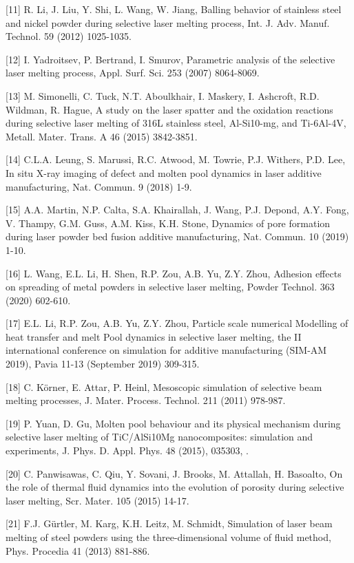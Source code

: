 \documentclass[10pt]{article}
\begin{document}
[11] R. Li, J. Liu, Y. Shi, L. Wang, W. Jiang, Balling behavior of stainless steel and nickel powder during selective laser melting process, Int. J. Adv. Manuf. Technol. 59 (2012) 1025-1035.

[12] I. Yadroitsev, P. Bertrand, I. Smurov, Parametric analysis of the selective laser melting process, Appl. Surf. Sci. 253 (2007) 8064-8069.

[13] M. Simonelli, C. Tuck, N.T. Aboulkhair, I. Maskery, I. Ashcroft, R.D. Wildman, R. Hague, A study on the laser spatter and the oxidation reactions during selective laser melting of 316L stainless steel, Al-Si10-mg, and Ti-6Al-4V, Metall. Mater. Trans. A 46 (2015) 3842-3851.

[14] C.L.A. Leung, S. Marussi, R.C. Atwood, M. Towrie, P.J. Withers, P.D. Lee, In situ X-ray imaging of defect and molten pool dynamics in laser additive manufacturing, Nat. Commun. 9 (2018) 1-9.

[15] A.A. Martin, N.P. Calta, S.A. Khairallah, J. Wang, P.J. Depond, A.Y. Fong, V. Thampy, G.M. Guss, A.M. Kiss, K.H. Stone, Dynamics of pore formation during laser powder bed fusion additive manufacturing, Nat. Commun. 10 (2019) 1-10.

[16] L. Wang, E.L. Li, H. Shen, R.P. Zou, A.B. Yu, Z.Y. Zhou, Adhesion effects on spreading of metal powders in selective laser melting, Powder Technol. 363 (2020) 602-610.

[17] E.L. Li, R.P. Zou, A.B. Yu, Z.Y. Zhou, Particle scale numerical Modelling of heat transfer and melt Pool dynamics in selective laser melting, the II international conference on simulation for additive manufacturing (SIM-AM 2019), Pavia 11-13 (September 2019) 309-315.

[18] C. Körner, E. Attar, P. Heinl, Mesoscopic simulation of selective beam melting processes, J. Mater. Process. Technol. 211 (2011) 978-987.

[19] P. Yuan, D. Gu, Molten pool behaviour and its physical mechanism during selective laser melting of TiC/AlSi10Mg nanocomposites: simulation and experiments, J. Phys. D. Appl. Phys. 48 (2015), 035303, .

[20] C. Panwisawas, C. Qiu, Y. Sovani, J. Brooks, M. Attallah, H. Basoalto, On the role of thermal fluid dynamics into the evolution of porosity during selective laser melting, Scr. Mater. 105 (2015) 14-17.

[21] F.J. Gürtler, M. Karg, K.H. Leitz, M. Schmidt, Simulation of laser beam melting of steel powders using the three-dimensional volume of fluid method, Phys. Procedia 41 (2013) 881-886.
\end{document}
